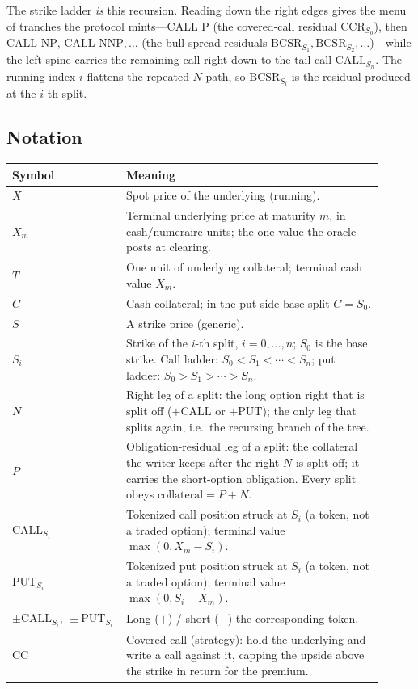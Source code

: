 \documentclass[11pt]{article}
\newcommand{\Call}{\mathrm{CALL}}
\newcommand{\Put}{\mathrm{PUT}}
\newcommand{\CCR}{\mathrm{CCR}_{S_0}}
\newcommand{\BCSR}{\mathrm{BCSR}}
\newcommand{\CP}{\mathrm{CALL\_P}}
\newcommand{\CNP}{\mathrm{CALL\_NP}}
\begin{document}
The strike ladder \emph{is} this recursion. Reading down the right edges gives the menu
of tranches the protocol mints---$\CP$ (the covered-call residual $\CCR$), then
$\CNP,\,\mathrm{CALL\_NNP},\dots$ (the bull-spread residuals $\BCSR_{S_1},\BCSR_{S_2},\dots$)---while
the left spine carries the remaining call right down to the tail call $\Call_{S_n}$. The
running index $i$ flattens the repeated-$N$ path, so $\BCSR_{S_i}$ is the residual produced
at the $i$-th split.

\subsection{Notation}

\begin{longtable}{>{\raggedright\arraybackslash}p{0.23\linewidth}p{0.68\linewidth}}
\toprule
Symbol & Meaning \\
\midrule
$X$ & Spot price of the underlying (running). \\
$X_m$ & Terminal underlying price at maturity $m$, in cash/numeraire units; the one value the oracle posts at clearing. \\
$T$ & One unit of underlying collateral; terminal cash value $X_m$. \\
$C$ & Cash collateral; in the put-side base split $C=S_0$. \\
$S$ & A strike price (generic). \\
$S_i$ & Strike of the $i$-th split, $i=0,\dots,n$; $S_0$ is the base strike. Call ladder: $S_0<S_1<\cdots<S_n$; put ladder: $S_0>S_1>\cdots>S_n$. \\
$N$ & Right leg of a split: the long option right that is split off ($+\Call$ or $+\Put$); the only leg that splits again, i.e.\ the recursing branch of the tree. \\
$P$ & Obligation-residual leg of a split: the collateral the writer keeps after the right $N$ is split off; it carries the short-option obligation. Every split obeys $\text{collateral}=P+N$. \\
$\Call_{S_i}$ & Tokenized call position struck at $S_i$ (a token, not a traded option); terminal value $\max(0,X_m-S_i)$. \\
$\Put_{S_i}$ & Tokenized put position struck at $S_i$ (a token, not a traded option); terminal value $\max(0,S_i-X_m)$. \\
$\pm\Call_{S_i},\ \pm\Put_{S_i}$ & Long ($+$) / short ($-$) the corresponding token. \\
$\mathrm{CC}$ & Covered call (strategy): hold the underlying and write a call against it, capping the upside above the strike in return for the premium. \\

\end{longtable}
\end{document}
